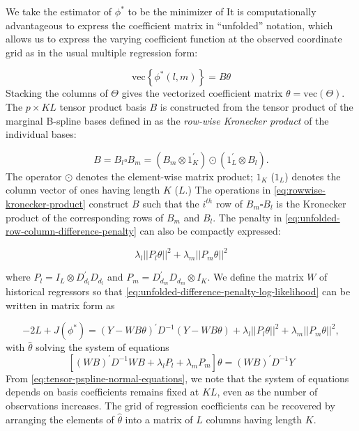 \documentclass[12pt]{article}
\newcommand{\ms}{\scriptscriptstyle}
\theoremstyle{definition}
\begin{document}
\noindent
We take the estimator of $\phi^*$ to be the minimizer of 
It is computationally advantageous to express the coefficient matrix in ``unfolded'' notation, which allows us to express the varying coefficient function at the observed coordinate grid as in the usual multiple regression form:

\begin{equation*}
\mbox{vec}\left\{\phi^*\left(l,m\right)\right\} = B \theta
\end{equation*}
\noindent
Stacking the columns of $\Theta$ gives the vectorized coefficient matrix $\theta = \mbox{vec}\left( \Theta \right)$. The $p \times KL$ tensor product basis $B$ is constructed from the tensor product of the marginal B-spline bases defined in \citet{eilers2006fast} as the \textit{row-wise Kronecker product} of the individual bases:

\begin{equation} \label{eq:rowwise-kronecker-product}
B = B_l \square B_m = \left( B_m \otimes 1^\prime_{K} \right) \odot \left(1^\prime_{L} \otimes  B_l  \right).
\end{equation}
\noindent
The operator $\odot$ denotes the element-wise matrix product; $1_K$ ($1_L$) denotes the column vector of ones having length $K$ ($L$.) The operations in \ref{eq:rowwise-kronecker-product} construct $B$ such that the $i^{th}$ row of $B_m\square B_l$ is the Kronecker product of the corresponding rows of $B_m$ and $B_l$. The penalty in \ref{eq:unfolded-row-column-difference-penalty} can also be compactly expressed:

\begin{equation*} \label{eq:tensor-product-penalty}
\lambda_l \vert \vert P_l \theta \vert \vert^2 + \lambda_m \vert \vert P_m \theta \vert\vert^2
\end{equation*}

where $P_l = I_L \otimes D_{d_{\ms l}}^\prime D_{d_{\ms l}} $ and $P_m =  D_{d_{\ms m}}^\prime D_{d_{\ms m}} \otimes I_K$. We define the matrix $W$ of historical regressors so that \ref{eq:unfolded-difference-penalty-log-likelihood} can be written in matrix form as

\begin{equation} \label{eq:tensor-pspline-objective-function}
-2L + J\left(\phi^*\right) = \left( Y - WB\theta\right)^\prime D^{-1}\left( Y - WB\theta\right)  + \lambda_l \vert\vert P_l \theta \vert\vert^2 + \lambda_m \vert\vert P_m \theta\vert \vert^2,
\end{equation}
\noindent
with $\hat{\theta}$ solving the system of equations 
\begin{equation} \label{eq:tensor-pspline-normal-equations}
\left[ \left(WB\right)^\prime D^{-1} WB +  \lambda_l P_l+ \lambda_m P_m\right]\theta = \left(W B\right)^\prime D^{-1}Y
\end{equation}
\noindent
From \ref{eq:tensor-pspline-normal-equations}, we note that the system of equations depends on basis coefficients remains fixed at $KL$, even as the number of observations increases.   The grid of regression coefficients can be recovered by arranging the elements of $\hat{\theta}$ into a matrix of $L$ columns having length $K$. 
\end{document}
